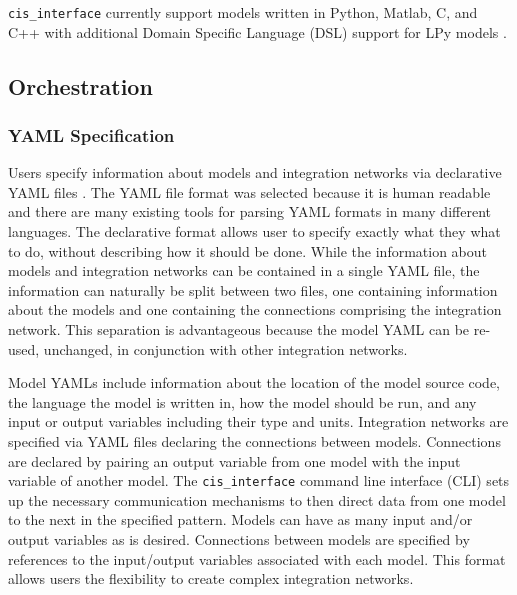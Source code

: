 \documentclass[journal]{IEEEtran}
\newcommand{\cis}{{\tt cis\_interface}{}}
\begin{document}
{\cis} currently support models written in Python, Matlab, C, and C++ with 
additional Domain Specific Language (DSL) support for LPy models \citep{Boudon2012}. 

\subsection{Orchestration}\label{SS:orchestration}
%

\subsubsection{YAML Specification}\label{SSS:yaml}
%
Users specify information about models and integration networks via declarative 
YAML files \citep{Ben-Kiki2009}. The YAML file format was selected because it is human readable 
and there are many existing tools for parsing YAML formats in many different 
languages. The declarative format allows user to specify exactly what they 
what to do, without describing how it should be done. While the information 
about models and integration networks can be contained in a single YAML 
file, the information can naturally be split between two files, one containing 
information about the models and one containing the connections comprising the 
integration network. This separation is advantageous because the model YAML 
can be re-used, unchanged, in conjunction with other integration networks. 

Model YAMLs include information about the location of the 
model source code, the language the model is written in, how the model should 
be run, and any input or output variables including their type and units. 
Integration networks are specified via YAML files declaring the connections 
between models. Connections are declared by pairing an output variable from 
one model with the input variable of another model. The {\cis} 
command line interface (CLI) sets up the necessary communication mechanisms to 
then direct data from one model to the next in the specified pattern. Models 
can have as many input and/or output variables as is desired.
Connections between models are specified by references to the 
input/output variables associated with each model. This format allows users the 
flexibility to create complex integration networks. 
\end{document}
